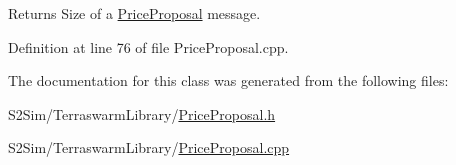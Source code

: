 \begin{DoxyReturn}{Returns}
Size of a \hyperlink{class_terra_swarm_1_1_synchronous_1_1_price_proposal}{Price\-Proposal} message. 
\end{DoxyReturn}


Definition at line 76 of file Price\-Proposal.\-cpp.



The documentation for this class was generated from the following files\-:\begin{DoxyCompactItemize}
\item 
S2\-Sim/\-Terraswarm\-Library/\hyperlink{_price_proposal_8h}{Price\-Proposal.\-h}\item 
S2\-Sim/\-Terraswarm\-Library/\hyperlink{_price_proposal_8cpp}{Price\-Proposal.\-cpp}\end{DoxyCompactItemize}
